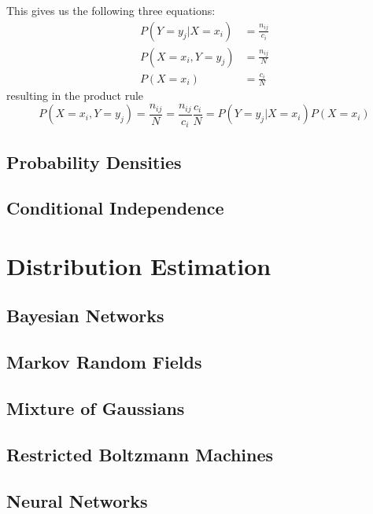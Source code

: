 \documentclass{article}
\begin{document}
This gives us the following three equations:
\begin{align}
	P(Y=y_j|X=x_i) &= \frac{n_{ij}}{c_i}\\
	P(X=x_i, Y=y_j) &= \frac{n_{ij}}{N}\\
	P(X=x_i) &= \frac{c_i}{N}
\end{align}
resulting in the product rule
\begin{equation}
	P(X=x_i, Y=y_j) = \frac{n_{ij}}{N} = \frac{n_{ij}}{c_i} \frac{c_i}{N} = P(Y=y_j | X=x_i) P(X=x_i)
\end{equation}

\subsection{Probability Densities}

\subsection{Conditional Independence}

\section{Distribution Estimation}

\subsection{Bayesian Networks}

\subsection{Markov Random Fields}

\subsection{Mixture of Gaussians}

\subsection{Restricted Boltzmann Machines}

\subsection{Neural Networks}
\end{document}
